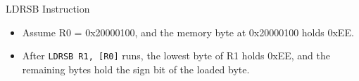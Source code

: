 \documentclass[9pt,aspectratio=169,xcolor=table]{beamer}
\begin{document}
{\begin{frame}[fragile]{LDRSB Instruction}
{%
	}
	\vspace{4mm}

	\begin{itemize}
		\item Assume R0 = 0x20000100, and the \alert{memory byte} at 0x20000100 holds 0xEE.
		\item After \texttt{LDRSB R1, [R0]} runs, the lowest byte of R1 holds 0xEE, and the remaining bytes hold the sign bit of the loaded byte.
	\end{itemize}
\end{frame}
}
\end{document}
